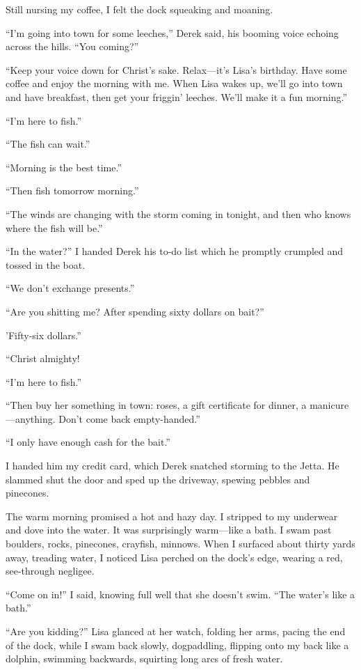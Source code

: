 Still nursing my coffee, I felt the dock squeaking and moaning.

``I'm going into town for some leeches,'' Derek said, his booming voice
echoing across the hills. ``You coming?''

``Keep your voice down for Christ's sake. Relax---it's Lisa's birthday.
Have some coffee and enjoy the morning with me. When Lisa wakes up,
we'll go into town and have breakfast, then get your friggin' leeches.
We'll make it a fun morning.''

``I'm here to fish.''

``The fish can wait.''

``Morning is the best time.''

``Then fish tomorrow morning.''

``The winds are changing with the storm coming in tonight, and then who
knows where the fish will be.''

``In the water?'' I handed Derek his to-do list which he promptly
crumpled and tossed in the boat.

``We don't exchange presents.''

``Are you shitting me? After spending sixty dollars on bait?''

'Fifty-six dollars.''

``Christ almighty!

``I'm here to fish.''

``Then buy her something in town: roses, a gift certificate for dinner,
a manicure---anything. Don't come back empty-handed.''

``I only have enough cash for the bait.''

I handed him my credit card, which Derek snatched storming to the Jetta.
He slammed shut the door and sped up the driveway, spewing pebbles and
pinecones.

The warm morning promised a hot and hazy day. I stripped to my underwear
and dove into the water. It was surprisingly warm---like a bath. I swam
past boulders, rocks, pinecones, crayfish, minnows. When I surfaced
about thirty yards away, treading water, I noticed Lisa perched on the
dock's edge, wearing a red, see-through negligee.

``Come on in!'' I said, knowing full well that she doesn't swim. ``The
water's like a bath.''

``Are you kidding?'' Lisa glanced at her watch, folding her arms, pacing
the end of the dock, while I swam back slowly, dogpaddling, flipping
onto my back like a dolphin, swimming backwards, squirting long arcs of
fresh water.

